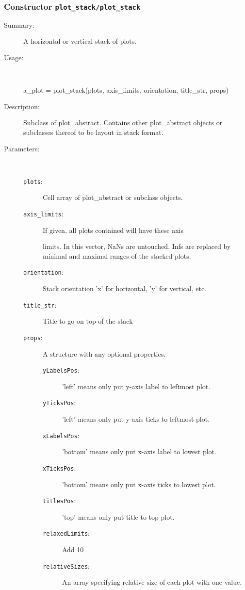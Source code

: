 \subsubsection[Constructor \texttt{plot\_stack}]{Constructor \texttt{plot\_stack/plot\_stack}}%
%
\label{ref_plot_stack__plot_stack}%
\hypertarget{ref_plot_stack__plot_stack}{}%
\begin{description}
\item[Summary:]A horizontal or vertical stack of plots.
%
\item[Usage:]~%
\begin{lyxcode}%
a\_plot = plot\_stack(plots, axis\_limits, orientation, title\_str, props)
%
\end{lyxcode}%
%
\item[Description:]%
Subclass of plot\_abstract. Contains other plot\_abstract objects or
 subclasses thereof to be layout in stack format. 
\item[Parameters:]~
\begin{description}%
\item[\texttt{plots}:]
 Cell array of plot\_abstract or subclass objects.
\item[\texttt{axis\_limits}:]
 If given, all plots contained will have these axis

limits. In this vector, NaNs are untouched, Infs are
replaced by minimal and maximal ranges of the
stacked plots.
\item[\texttt{orientation}:]
 Stack orientation 'x' for horizontal, 'y' for vertical, etc.
\item[\texttt{title\_str}:]
 Title to go on top of the stack
\item[\texttt{props}:]
 A structure with any optional properties.
\begin{description}%
\item[\texttt{yLabelsPos}:]
 'left' means only put y-axis label to leftmost plot.
\item[\texttt{yTicksPos}:]
 'left' means only put y-axis ticks to leftmost plot.
\item[\texttt{xLabelsPos}:]
 'bottom' means only put x-axis label to lowest plot.
\item[\texttt{xTicksPos}:]
 'bottom' means only put x-axis ticks to lowest plot.
\item[\texttt{titlesPos}:]
 'top' means only put title to top plot.
\item[\texttt{relaxedLimits}:]
 Add 10%
\item[\texttt{relativeSizes}:]
 An array specifying relative size of each plot with one value.


\end{description}
\end{description}
\end{description}
